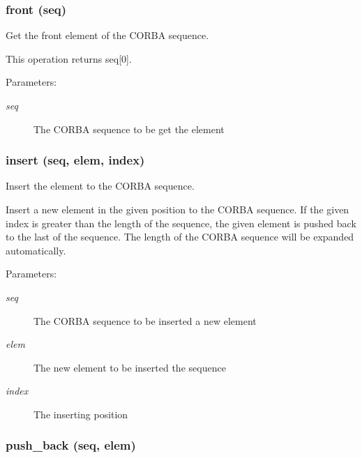 \subsubsection{\setlength{\rightskip}{0pt plus 5cm}front (seq)}\label{CORBA__SeqUtil_8py_a5}


Get the front element of the CORBA sequence. 

This operation returns seq[0].

\begin{Desc}
\item[Parameters:]
\begin{description}
\item[{\em seq}]The CORBA sequence to be get the element\end{description}
\end{Desc}
\subsubsection{\setlength{\rightskip}{0pt plus 5cm}insert (seq, elem, index)}\label{CORBA__SeqUtil_8py_a4}


Insert the element to the CORBA sequence. 

Insert a new element in the given position to the CORBA sequence. If the given index is greater than the length of the sequence, the given element is pushed back to the last of the sequence. The length of the CORBA sequence will be expanded automatically.

\begin{Desc}
\item[Parameters:]
\begin{description}
\item[{\em seq}]The CORBA sequence to be inserted a new element \item[{\em elem}]The new element to be inserted the sequence \item[{\em index}]The inserting position\end{description}
\end{Desc}
\subsubsection{\setlength{\rightskip}{0pt plus 5cm}push\_\-back (seq, elem)}\label{CORBA__SeqUtil_8py_a2}


